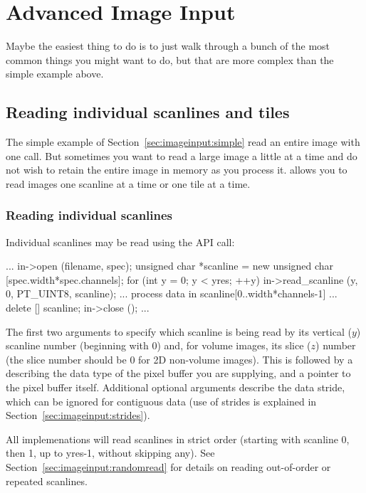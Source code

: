 \section{Advanced Image Input}
\label{sec:advancedimageinput}

Maybe the easiest thing to do is to just walk through a bunch of the
most common things you might want to do, but that are more complex than
the simple example above.


\subsection{Reading individual scanlines and tiles}
\label{sec:imageinput:scanlinestiles}

The simple example of Section~\ref{sec:imageinput:simple} read an
entire image with one call.  But sometimes you want to read a large
image a
little at a time and do not wish to retain the entire image in memory
as you process it.  \product allows you to read images
one scanline at a time or one tile at a time.

\subsubsection{Reading individual scanlines}

Individual scanlines may be read using the \readscanline API
call:

\begin{code}
        ...
        in->open (filename, spec);
        unsigned char *scanline = new unsigned char [spec.width*spec.channels];
        for (int y = 0;  y < yres;  ++y) {
            in->read_scanline (y, 0, PT_UINT8, scanline);
            ... process data in scanline[0..width*channels-1] ...
        }
        delete [] scanline;
        in->close ();
        ...
\end{code}

The first two arguments to \readscanline specify which scanline
is being read by its vertical ($y$) scanline number (beginning with 0)
and, for volume images, its slice ($z$) number (the slice number should
be 0 for 2D non-volume images).  This is followed by a \ParamBaseType
describing the data type of the pixel buffer you are supplying, and a
pointer to the pixel buffer itself.  Additional optional arguments
describe the data stride, which can be ignored for contiguous data (use
of strides is explained in Section~\ref{sec:imageinput:strides}).

All \ImageInput implemenations will read scanlines in strict order
(starting with scanline 0, then 1, up to {\kw yres-1}, without skipping
any).  See Section~\ref{sec:imageinput:randomread} for details
on reading out-of-order or repeated scanlines.

